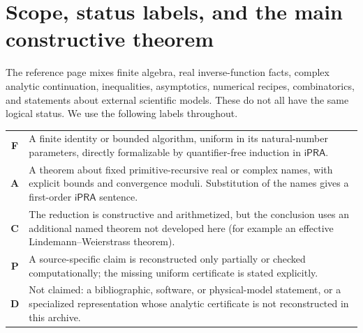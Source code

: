 \documentclass[11pt]{article}
\theoremstyle{definition}
\newcommand{\iPRA}{\mathsf{iPRA}}
\newcommand{\StatusF}{\textsf{F}}
\newcommand{\StatusA}{\textsf{A}}
\newcommand{\StatusC}{\textsf{C}}
\newcommand{\StatusP}{\textsf{P}}
\newcommand{\StatusD}{\textsf{D}}
\begin{document}
\newpage
\begingroup\small\tableofcontents\endgroup
\newpage

\section{Scope, status labels, and the main constructive theorem}\label{sec:scope}

The reference page mixes finite algebra, real inverse-function facts, complex
analytic continuation, inequalities, asymptotics, numerical recipes,
combinatorics, and statements about external scientific models.  These do not
all have the same logical status.  We use the following labels throughout.

\begin{center}
\begin{tabularx}{\textwidth}{>{\bfseries}c X}
\toprule
\StatusF & A finite identity or bounded algorithm, uniform in its natural-number
parameters, directly formalizable by quantifier-free induction in \(\iPRA\).\\
\StatusA & A theorem about fixed primitive-recursive real or complex names,
with explicit bounds and convergence moduli.  Substitution of the names gives a
first-order \(\iPRA\) sentence.\\
\StatusC & The reduction is constructive and arithmetized, but the conclusion
uses an additional named theorem not developed here (for example an effective
Lindemann--Weierstrass theorem).\\
\StatusP & A source-specific claim is reconstructed only partially or checked
computationally; the missing uniform certificate is stated explicitly.\\
\StatusD & Not claimed: a bibliographic, software, or physical-model statement,
or a specialized representation whose analytic certificate is not reconstructed
in this archive.\\
\bottomrule
\end{tabularx}
\end{center}
\end{document}
